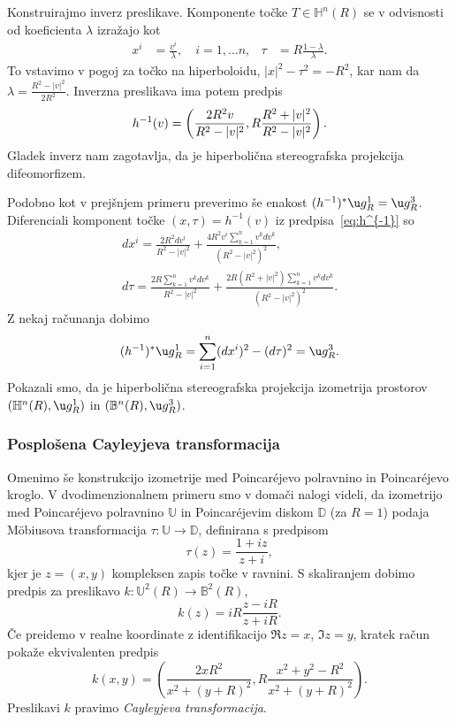 \documentclass[a4paper]{article}
\begin{document}
Konstruirajmo inverz preslikave. Komponente točke $T \in \mathbb{H}^{n}(R)$ se v odvisnosti od koeficienta $\lambda$ izražajo kot
\begin{align*}
x^{i} &= \frac{v^{i}}{\lambda}, \quad  i=1, \dots n, & \tau &= R \frac{1-\lambda}{\lambda}.
\end{align*}
To vstavimo v pogoj za točko na hiperboloidu, $|x|^2-\tau^2=-R^2$, kar nam da $\lambda = \frac{R^2-|v|^2}{2R^2}$.
Inverzna preslikava ima potem predpis
\begin{equation}\label{eq:h^{-1}}
h^{-1}(v) = \left( \frac{2R^2v}{R^2-|v|^2}, R \frac{R^2+|v|^2}{R^2-|v|^2} \right).
\end{equation} 
Gladek inverz nam zagotavlja, da je hiperbolična stereografska projekcija difeomorfizem.

Podobno kot v prejšnjem primeru preverimo še enakost $(h^{-1})^{*} \u g_{R}^{1} = \u g_{R}^{3}$.
Diferenciali komponent točke $(x,\tau)=h^{-1}(v)$ iz predpisa~\ref{eq:h^{-1}} so
\begin{gather*}
dx^{i} = \frac{2R^2dv^{i}}{R^2-|v|^2} + \frac{4R^2v^{i} \sum_{k=1}^{n}v^{k}dv^{k}}{(R^2-|v|^2)^2}, \\
d\tau = \frac{2R \sum_{k=1}^{n}v^{k}dv^{k}}{R^2-|v|^2} + \frac{2R(R^2+|v|^2) \sum_{k=1}^{n}v^{k}dv^{k}}{(R^2-|v|^2)^2}.
\end{gather*}
Z nekaj računanja dobimo
\[ (h^{-1})^{*} \u g_{R}^{1} = \sum_{i=1}^{n} (dx^{i})^2 - (d\tau)^2 = \u g_{R}^{3}. \]
Pokazali smo, da je hiperbolična stereografska projekcija izometrija prostorov $(\mathbb{H}^{n}(R), \u g_{R}^{1})$ in $(\mathbb{B}^{n}(R), \u g_{R}^{3})$.

\subsubsection{Posplošena Cayleyjeva transformacija}
Omenimo še konstrukcijo izometrije med Poincar\'ejevo polravnino in Poincar\'ejevo kroglo. 
V dvodimenzionalnem primeru smo v domači nalogi videli, da izometrijo med Poincar\'ejevo polravnino $\mathbb{U}$ in Poincar\'ejevim diskom $\mathbb{D}$ (za $R=1$) podaja M\"obiusova transformacija $\tau \colon \mathbb{U} \to \mathbb{D}$, definirana s predpisom
\begin{equation}
\tau(z) = \frac{1+iz}{z+i},
\end{equation} 
kjer je $z=(x,y)$ kompleksen zapis točke v ravnini. S skaliranjem dobimo predpis za preslikavo $k \colon \mathbb{U}^{2}(R) \to \mathbb{B}^{2}(R)$,
\begin{equation}
k(z) = iR \frac{z-iR}{z+iR}.
\end{equation} 
Če preidemo v realne koordinate z identifikacijo $\Re{z}=x$, $\Im{z}=y$, kratek račun pokaže ekvivalenten predpis
\begin{equation}
k(x,y) = \left( \frac{2xR^2}{x^2+(y+R)^2}, R \frac{x^2+y^2-R^2}{x^2+(y+R)^2} \right).
\end{equation}
Preslikavi $k$ pravimo \emph{Cayleyjeva transformacija}.
\end{document}
